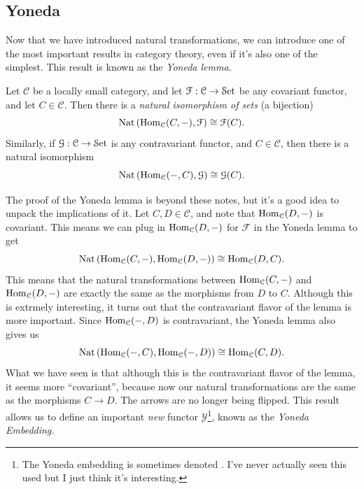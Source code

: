 \subsection{Yoneda}

Now that we have introduced natural transformations, we can introduce one of the most important results in category theory, even if it's also one of the simplest. This result is known as the \emph{Yoneda lemma}.

\begin{lemma}[Yoneda]\label{lma:1}
	Let $\mathcal{C} $ be a locally small category, and let $\mathcal{F} : \mathcal{C}  \to \mathcal{S}\mathrm{et}  $ be any covariant functor, and let $C\in \mathcal{C} $. Then there is a \emph{natural isomorphism of sets} (a bijection)
	\[
		\operatorname{Nat} \left( \operatorname{Hom}_{\mathcal{C} }(C, -) ,\mathcal{F}  \right) \cong \mathcal{F} (C)
	.\]
	Similarly, if $\mathcal{G} : \mathcal{C}  \to \mathcal{S}\mathrm{et} $ is any contravariant functor, and $C\in \mathcal{C} $, then there is a natural isomorphism
	\[
		\operatorname{Nat} \left( \operatorname{Hom}_{\mathcal{C} }(-, C) ,\mathcal{G}  \right)\cong  \mathcal{G} (C)
	.\]
\end{lemma}

The proof of the Yoneda lemma is beyond these notes, but it's a good idea to unpack the implications of it. Let $C,D\in \mathcal{C} $, and note that $\operatorname{Hom}_{\mathcal{C} }(D, -) $ is covariant. This means we can plug in $\operatorname{Hom}_{\mathcal{C} }(D, -) $ for $\mathcal{F} $ in the Yoneda lemma to get
\[
	\operatorname{Nat} \left( \operatorname{Hom}_{\mathcal{C} }(C, -) ,\operatorname{Hom}_{\mathcal{C} }(D, -)  \right) \cong \operatorname{Hom}_{\mathcal{C} }(D, C) 
.\]
This means that the natural transformations between $\operatorname{Hom}_{\mathcal{C} }(C, -) $ and $\operatorname{Hom}_{\mathcal{C} }(D, -) $ are exactly the same as the morphisms from $D$ to $C$. Although this is extrmely interesting, it turns out that the contravariant flavor of the lemma is more important. Since $\operatorname{Hom}_{\mathcal{C} }(-, D) $ is contravariant, the Yoneda lemma also gives us
\[
	\operatorname{Nat} \left( \operatorname{Hom}_{\mathcal{C} }(-, C) ,\operatorname{Hom}_{\mathcal{C} }(-, D)  \right) \cong \operatorname{Hom}_{\mathcal{C} }(C, D) 
.\]
What we have seen is that although this is the contravariant flavor of the lemma, it seems more ``covariant'', because now our natural transformations are the same as the morphisms $C\to D$. The arrows are no longer being flipped. This result allows us to define an important \emph{new} functor $\mathcal{Y} $\footnote{The Yoneda embedding is sometimes denoted \yo. I've never actually seen this used but I just think it's interesting.}, known as the \emph{Yoneda Embedding.}

